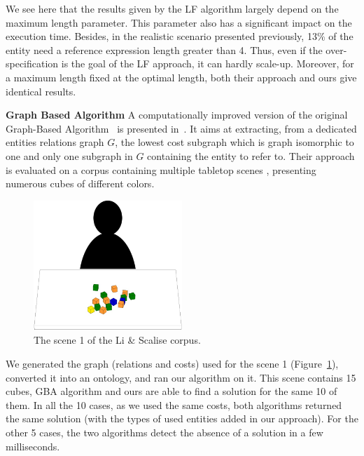 \documentclass[a4paper,11pt,twoside]{StyleThese}
\begin{document}
We see here that the results given by the LF algorithm largely depend on the maximum length parameter. This parameter also has a significant impact on the execution time. Besides, in the realistic scenario presented previously, 13\% of the entity need a reference expression length greater than 4. Thus, even if the over-specification is the goal of the LF approach, it can hardly scale-up. Moreover, for a maximum length fixed at the optimal length, both their approach and ours give identical results.

\textbf{Graph Based Algorithm}
A computationally improved version of the original Graph-Based Algorithm~\cite{viethen2013graphs} is presented in~\cite{li2017automatically}. It aims at extracting, from a dedicated entities relations graph $G$, the lowest cost subgraph which is graph isomorphic to one and only one subgraph in $G$ containing the entity to refer to.
Their approach is evaluated on a corpus containing multiple tabletop scenes \cite{scalise2018natural}, presenting numerous cubes of different colors.

\begin{figure}[hbtp]
\centering
\includegraphics[width=0.5\textwidth]{figures/chapter3/liscene1.png}
\caption{The scene 1 of the Li \& Scalise corpus.}
\label{fig:gbacorpus}
\end{figure}

We generated the graph (relations and costs) used for the scene 1 (Figure~\ref{fig:gbacorpus}), converted it into an ontology, and ran our algorithm on it.
This scene contains 15 cubes, GBA algorithm and ours are able to find a solution for the same 10 of them. In all the 10 cases, as we used the same costs, both algorithms returned the same solution (with the types of used entities added in our approach). 
For the other 5 cases, the two algorithms detect the absence of a solution in a few milliseconds.
\end{document}
